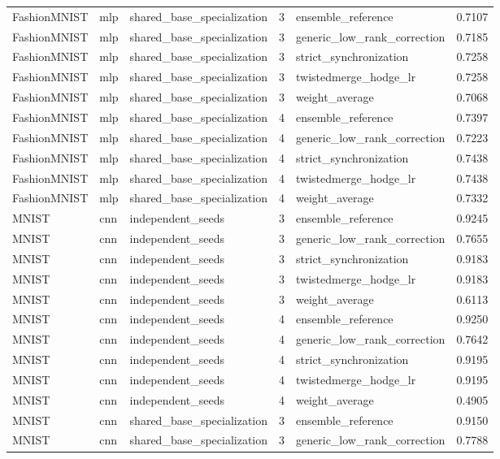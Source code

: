 \begin{table}[t]
\begin{tabular}{llllll}
FashionMNIST & mlp & shared\_base\_specialization & 3 & ensemble\_reference & 0.7107 \\
FashionMNIST & mlp & shared\_base\_specialization & 3 & generic\_low\_rank\_correction & 0.7185 \\
FashionMNIST & mlp & shared\_base\_specialization & 3 & strict\_synchronization & 0.7258 \\
FashionMNIST & mlp & shared\_base\_specialization & 3 & twistedmerge\_hodge\_lr & 0.7258 \\
FashionMNIST & mlp & shared\_base\_specialization & 3 & weight\_average & 0.7068 \\
FashionMNIST & mlp & shared\_base\_specialization & 4 & ensemble\_reference & 0.7397 \\
FashionMNIST & mlp & shared\_base\_specialization & 4 & generic\_low\_rank\_correction & 0.7223 \\
FashionMNIST & mlp & shared\_base\_specialization & 4 & strict\_synchronization & 0.7438 \\
FashionMNIST & mlp & shared\_base\_specialization & 4 & twistedmerge\_hodge\_lr & 0.7438 \\
FashionMNIST & mlp & shared\_base\_specialization & 4 & weight\_average & 0.7332 \\
MNIST & cnn & independent\_seeds & 3 & ensemble\_reference & 0.9245 \\
MNIST & cnn & independent\_seeds & 3 & generic\_low\_rank\_correction & 0.7655 \\
MNIST & cnn & independent\_seeds & 3 & strict\_synchronization & 0.9183 \\
MNIST & cnn & independent\_seeds & 3 & twistedmerge\_hodge\_lr & 0.9183 \\
MNIST & cnn & independent\_seeds & 3 & weight\_average & 0.6113 \\
MNIST & cnn & independent\_seeds & 4 & ensemble\_reference & 0.9250 \\
MNIST & cnn & independent\_seeds & 4 & generic\_low\_rank\_correction & 0.7642 \\
MNIST & cnn & independent\_seeds & 4 & strict\_synchronization & 0.9195 \\
MNIST & cnn & independent\_seeds & 4 & twistedmerge\_hodge\_lr & 0.9195 \\
MNIST & cnn & independent\_seeds & 4 & weight\_average & 0.4905 \\
MNIST & cnn & shared\_base\_specialization & 3 & ensemble\_reference & 0.9150 \\
MNIST & cnn & shared\_base\_specialization & 3 & generic\_low\_rank\_correction & 0.7788 \\

\end{tabular}
\end{table}
